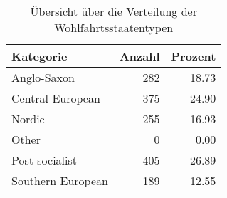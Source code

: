 \begin{table}[!h]
\centering
\caption{Übersicht über die Verteilung der Wohlfahrtsstaatentypen}
\centering
\begin{tabular}[t]{lrr}
\toprule
Kategorie & Anzahl & Prozent\\
\midrule
Anglo-Saxon & 282 & 18.73\\
Central European & 375 & 24.90\\
Nordic & 255 & 16.93\\
Other & 0 & 0.00\\
Post-socialist & 405 & 26.89\\
\addlinespace
Southern European & 189 & 12.55\\
\bottomrule
\end{tabular}
\end{table}
